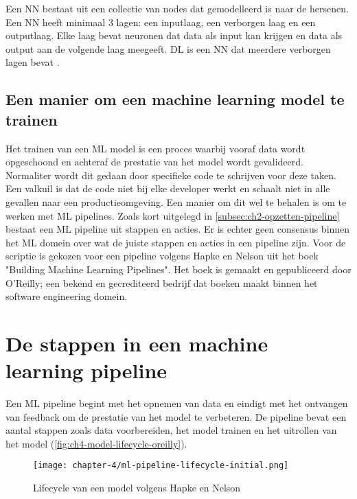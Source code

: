 Een NN bestaat uit een collectie van nodes dat gemodelleerd is naar de hersenen. Een NN heeft minimaal 3 lagen: een inputlaag, een verborgen laag en een outputlaag. Elke laag bevat neuronen dat data als input kan krijgen en data als output aan de volgende laag meegeeft. DL is een NN dat meerdere verborgen lagen bevat \cite{ml-neural-network-nicholson}.

\subsection{Een manier om een machine learning model te trainen}\label{subsec:ch4-een-manier-om-een-machine-learning-model-te-trainen}
Het trainen van een ML model is een proces waarbij vooraf data wordt opgeschoond en achteraf de prestatie van het model wordt gevalideerd. Normaliter wordt dit gedaan door specifieke code te schrijven voor deze taken. Een valkuil is dat de code niet bij elke developer werkt en schaalt niet in alle gevallen naar een productieomgeving. Een manier om dit wel te behalen is om te werken met ML pipelines. Zoals kort uitgelegd in \autoref{subsec:ch2-opzetten-pipeline} bestaat een ML pipeline uit stappen en acties. Er is echter geen consensus binnen het ML domein over wat de juiste stappen en acties in een pipeline zijn. Voor de scriptie is gekozen voor een pipeline volgens Hapke en Nelson uit het boek "Building Machine Learning Pipelines". Het boek is gemaakt en gepubliceerd door O'Reilly; een bekend en gecrediteerd bedrijf dat boeken maakt binnen het software engineering domein.

\section{De stappen in een machine learning pipeline}\label{sec:ch4-de-stappen-in-een-machine-learning-pipeline}
Een ML pipeline begint met het opnemen van data en eindigt met het ontvangen van feedback om de prestatie van het model te verbeteren. De pipeline bevat een aantal stappen zoals data voorbereiden, het model trainen en het uitrollen van het model (\autoref{fig:ch4-model-lifecycle-oreilly}).

\begin{figure}[hbt!]
  \centering
  \texttt{[image: chapter-4/ml-pipeline-lifecycle-initial.png]}
  \caption{Lifecycle van een model volgens Hapke en Nelson \cite[p.~4]{building-machine-learning-pipelines-oreilly}}
  \label{fig:ch4-model-lifecycle-oreilly}
\end{figure}

